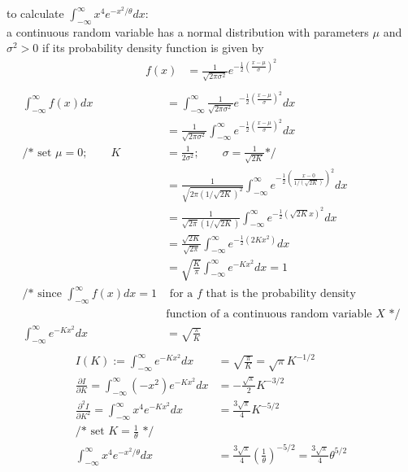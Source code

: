 \documentclass[12pt,border=4pt,multi]{article} %
\begin{document}
to calculate $\int_{-\infty}^{\infty} x^4 e^{-x^2 / \theta} dx$:\\ 
a continuous random variable has a normal distribution with parameters $\mu$ and $\sigma^2 > 0$ if its probability density function is given by
{\large
\begin{align*}
f(x) &= \frac{1}{\sqrt{2\pi\sigma^2}} e^{-\frac{1}{2}\left(\frac{x - \mu}{\sigma}\right)^2}\\
\end{align*}}
\begin{align*}
\int_{-\infty}^{\infty} f(x) dx &= \int_{-\infty}^{\infty} \frac{1}{\sqrt{2\pi\sigma^2}} e^{-\frac{1}{2}\left(\frac{x - \mu}{\sigma}\right)^2} dx\\
&= \frac{1}{\sqrt{2\pi\sigma^2}} \int_{-\infty}^{\infty} e^{-\frac{1}{2}\left(\frac{x - \mu}{\sigma}\right)^2} dx\\
\text{/* set } \mu = 0; \qquad K &= \frac{1}{2\sigma^2}; \qquad \sigma = \frac{1}{\sqrt{2K}} \text{*/}\\
&= \frac{1}{\sqrt{2\pi(1/\sqrt{2K})^2}} \int_{-\infty}^{\infty} e^{-\frac{1}{2}\left(\frac{x - 0}{1/(\sqrt{2K})}\right)^2} dx\\
&= \frac{1}{\sqrt{2\pi}(1/\sqrt{2K})} \int_{-\infty}^{\infty} e^{-\frac{1}{2}\left(\sqrt{2K}x\right)^2} dx\\
&= \frac{\sqrt{2K}}{\sqrt{2\pi}} \int_{-\infty}^{\infty} e^{-\frac{1}{2}\left(2Kx^2\right)} dx\\
&= \sqrt{\frac{K}{\pi}} \int_{-\infty}^{\infty} e^{-Kx^2} dx = 1\\
\text{/* since } \int_{-\infty}^{\infty} f(x)dx  = 1 &\text{ for a $f$ that is the probability density}\\
&\text{function of a continuous random variable $X$}\text{ */}\\
\int_{-\infty}^{\infty} e^{-Kx^2} dx &= \sqrt{\frac{\pi}{K}}\\
\end{align*}
\begin{align*}
I(K) := \int_{-\infty}^{\infty} e^{-Kx^2} dx &= \sqrt{\frac{\pi}{K}} = \sqrt{\pi}K^{-1 / 2}\\
\frac{\partial I}{\partial K} = \int_{-\infty}^{\infty} (-x^2)e^{-Kx^2} dx &= -\frac{\sqrt{\pi}}{2}K^{-3 / 2}\\
\frac{\partial^2 I}{\partial K^2} = \int_{-\infty}^{\infty} x^4 e^{-Kx^2} dx &= \frac{3\sqrt{\pi}}{4}K^{-5 / 2}\\
\text{/* set } K = \frac{1}{\theta} \text{ */}\\
\int_{-\infty}^{\infty} x^4 e^{-x^2 / \theta} dx &= \frac{3\sqrt{\pi}}{4}\left(\frac{1}{\theta}\right)^{-5 / 2}
= \frac{3\sqrt{\pi}}{4}\theta^{5 / 2}\\
\end{align*}
\end{document}

